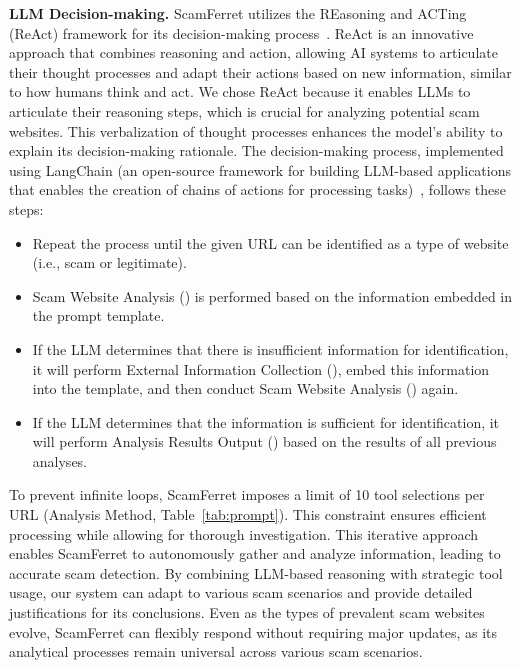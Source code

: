 \documentclass[runningheads]{llncs}
\begin{document}
\noindent\textbf{LLM Decision-making.}
ScamFerret utilizes the REasoning and ACTing (ReAct) framework for its decision-making process~\cite{DBLP:conf/iclr/YaoZYDSN023}.
ReAct is an innovative approach that combines reasoning and action, allowing AI systems to articulate their thought processes and adapt their actions based on new information, similar to how humans think and act.
We chose ReAct because it enables LLMs to articulate their reasoning steps, which is crucial for analyzing potential scam websites.
This verbalization of thought processes enhances the model's ability to explain its decision-making rationale.
The decision-making process, implemented using LangChain (an open-source framework for building LLM-based applications that enables the creation of chains of actions for processing tasks)~\cite{langchain}, follows these steps:
\begin{itemize}
\item Repeat the process until the given URL can be identified as a type of website (i.e., scam or legitimate).
\item Scam Website Analysis () is performed based on the information embedded in the prompt template.
\item If the LLM determines that there is insufficient information for identification, it will perform External Information Collection (), embed this information into the template, and then conduct Scam Website Analysis () again.
\item If the LLM determines that the information is sufficient for identification, it will perform Analysis Results Output () based on the results of all previous analyses.
\end{itemize}

To prevent infinite loops, ScamFerret imposes a limit of 10 tool selections per URL (Analysis Method, Table~\ref{tab:prompt}).
This constraint ensures efficient processing while allowing for thorough investigation.
This iterative approach enables ScamFerret to autonomously gather and analyze information, leading to accurate scam detection.
By combining LLM-based reasoning with strategic tool usage, our system can adapt to various scam scenarios and provide detailed justifications for its conclusions.
Even as the types of prevalent scam websites evolve, ScamFerret can flexibly respond without requiring major updates, as its analytical processes remain universal across various scam scenarios.
\end{document}
